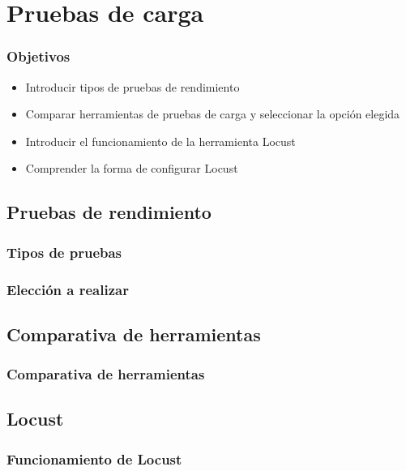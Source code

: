 \documentclass{beamer}
\theoremstyle{plain}
\theoremstyle{definition}
\theoremstyle{plain}
\theoremstyle{definition}
\theoremstyle{remark}
\theoremstyle{definition}
\begin{document}
\section{Pruebas de carga} %
\begin{frame}
	
	\frametitle{Objetivos}
	\begin{itemize}
		\item Introducir tipos de pruebas de rendimiento
		\item Comparar herramientas de pruebas de carga y seleccionar la opción elegida
		\item Introducir el funcionamiento de la herramienta Locust
		\item Comprender la forma de configurar Locust 
	\end{itemize}
	
\end{frame}

\subsection{Pruebas de rendimiento}
\begin{frame}
	\frametitle{Tipos de pruebas}
	
\end{frame}
\begin{frame}
	\frametitle{Elección a realizar}
	
\end{frame}

\subsection{Comparativa de herramientas}
\begin{frame}
	\frametitle{Comparativa de herramientas}
	
\end{frame}

\subsection{Locust}
\begin{frame}
	\frametitle{Funcionamiento de Locust}
	
\end{frame}
\begin{frame}
	\frametitle{Locustfile
\end{frame}
\end{document}
